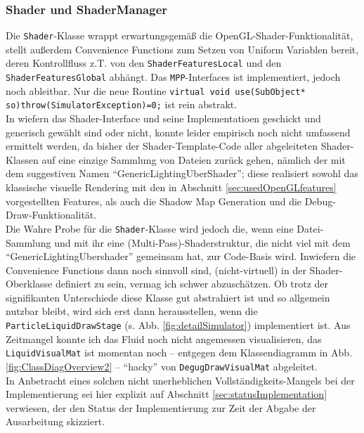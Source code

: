 	
	\subsubsection{Shader und ShaderManager}
	\label{sec:Shader}
		
		Die \lstinline|Shader|-Klasse wrappt erwartungsgemäß die OpenGL-Shader-Funktionalität,
		stellt außerdem Convenience Functions zum Setzen von Uniform Variablen bereit, deren Kontrollfluss
		z.T. von den \lstinline|ShaderFeaturesLocal| und den \lstinline|ShaderFeaturesGlobal| abhängt.
		Das \lstinline|MPP|-Interfaces ist implementiert, jedoch noch ableitbar.
		Nur die neue Routine  \lstinline|virtual void use(SubObject* so)throw(SimulatorException)=0;|
		ist rein abstrakt.\\
		
		In wiefern das Shader-Interface und seine Implementatioen geschickt und generisch gewählt sind
		oder nicht, konnte leider empirisch noch nicht umfassend ermittelt werden, da bisher der
		Shader-Template-Code aller abgeleiteten
		Shader-Klassen auf eine einzige Sammlung von Dateien zurück gehen, nämlich der mit dem suggestiven Namen
		"`GenericLightingUberShader"'; diese realisiert sowohl das klassische visuelle Rendering mit den in Abschnitt
		\ref{sec:usedOpenGLfeatures} vorgestellten Features, als auch die Shadow Map Generation und die
		Debug-Draw-Funktionalität.\\
		Die Wahre Probe für die \lstinline|Shader|-Klasse wird jedoch die, wenn eine Datei-Sammlung und mit ihr
		eine (Multi-Pass)-Shaderstruktur, die nicht viel mit dem "`GenericLightingUbershader"' gemeinsam hat,
		zur Code-Basis wird. Inwiefern die Convenience Functions dann noch sinnvoll sind,
		(nicht-virtuell) in der Shader-Oberklasse definiert zu sein, vermag ich schwer abzuschätzen.
		Ob trotz der signifikanten Unterschiede diese Klasse gut abstrahiert ist und so allgemein nutzbar bleibt,
		wird sich erst dann herausstellen, wenn die  \lstinline|ParticleLiquidDrawStage| 
		(s. Abb. \ref{fig:detailSimulator}) implementiert ist. 
		Aus Zeitmangel konnte ich das Fluid noch nicht angemessen visualisieren, das 
		\lstinline|LiquidVisualMat| ist momentan noch 
		-- entgegen dem Klassendiagramm in Abb. \ref{fig:ClassDiagOverview2} --
		"`hacky"' von \lstinline|DegugDrawVisualMat| abgeleitet.\\
		In Anbetracht eines solchen nicht unerheblichen Vollständigkeits-Mangels bei der Implementierung 
		sei hier explizit auf Abschnitt \ref{sec:statusImplementation} verwiesen, der den Status der Implementierung
		zur Zeit der Abgabe der Ausarbeitung skizziert.\\
	
